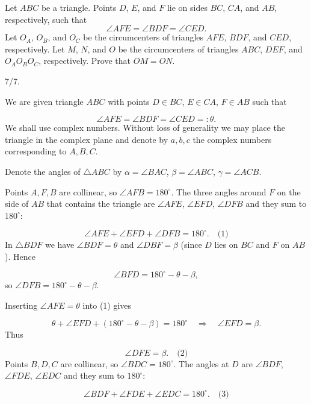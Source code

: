 \begin{mdframed}[style=mdpurplebox,frametitle={USAMO 2026 Problem 5}]
Let $ABC$ be a triangle. Points $D$, $E$, and $F$ lie on sides $BC$, $CA$, and $AB$, respectively, such that
\[
\angle AFE = \angle BDF = \angle CED.
\]
Let $O_A$, $O_B$, and $O_C$ be the circumcenters of triangles $AFE$, $BDF$, and $CED$, respectively. Let $M$, $N$, and $O$ be the circumcenters of triangles $ABC$, $DEF$, and $O_A O_B O_C$, respectively. Prove that $OM = ON$.
\end{mdframed}
\begin{remark*}
  7/7.
\end{remark*}
We are given triangle \(ABC\) with points \(D\in BC\), \(E\in CA\), \(F\in AB\) such that\par
\[
\angle AFE = \angle BDF = \angle CED =: \theta.
\]
We shall use complex numbers. Without loss of generality we may place the triangle in the complex plane and denote by \(a,b,c\) the complex numbers corresponding to \(A,B,C\).\par
\smallskip
{}
Denote the angles of \(\triangle ABC\) by \(\alpha = \angle BAC\), \(\beta = \angle ABC\), \(\gamma = \angle ACB\).\par
{}
Points \(A,F,B\) are collinear, so \(\angle AFB = 180^\circ\). The three angles around \(F\) on the side of \(AB\) that contains the triangle are \(\angle AFE\), \(\angle EFD\), \(\angle DFB\) and they sum to \(180^\circ\):\par
\[
\angle AFE + \angle EFD + \angle DFB = 180^\circ. \quad\text{(1)}
\]
In \(\triangle BDF\) we have \(\angle BDF = \theta\) and \(\angle DBF = \beta\) (since \(D\) lies on \(BC\) and \(F\) on \(AB\)). Hence\par
\[
\angle BFD = 180^\circ - \theta - \beta,
\]
so \(\angle DFB = 180^\circ - \theta - \beta\).\par
Inserting \(\angle AFE = \theta\) into (1) gives\par
\[
\theta + \angle EFD + (180^\circ - \theta - \beta) = 180^\circ \quad\Longrightarrow\quad \angle EFD = \beta.
\]
Thus\par
\[
\angle DFE = \beta. \quad\text{(2)}
\]
Points \(B,D,C\) are collinear, so \(\angle BDC = 180^\circ\). The angles at \(D\) are \(\angle BDF\), \(\angle FDE\), \(\angle EDC\) and they sum to \(180^\circ\):\par
\[
\angle BDF + \angle FDE + \angle EDC = 180^\circ. \quad\text{(3)}
\]
